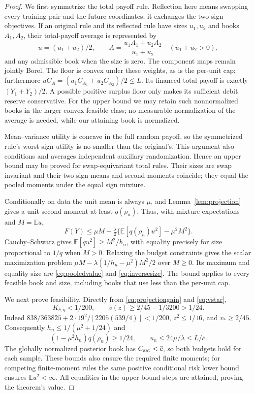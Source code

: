 \documentclass[11pt,a4paper]{amsart}
\theoremstyle{plain}
\theoremstyle{definition}
\theoremstyle{remark}
\newcommand{\EE}{\mathbb{E}}
\begin{document}
\begin{proof}
We first symmetrize the total payoff rule. Reflection here means swapping every training pair and the future coordinates; it exchanges the two sign objectives. If an original rule and its reflected rule have sizes $u_1,u_2$ and books $A_1,A_2$, their total-payoff average is represented by
\[
 u=(u_1+u_2)/2,\qquad
 A=\frac{u_1A_1+u_2A_2}{u_1+u_2}\quad(u_1+u_2>0),
\]
and any admissible book when the size is zero. The component maps remain jointly Borel. The floor is convex under these weights, as is the per-unit cap; furthermore
$uC_A=(u_1C_{A_1}+u_2C_{A_2})/2\le L$.
Its financed total payoff is exactly $(Y_1+Y_2)/2$. A possible positive surplus floor only makes its sufficient debit reserve conservative. For the upper bound we may retain such nonnormalized books in the larger convex feasible class; no measurable normalization of the average is needed, while our attaining book is normalized.

Mean--variance utility is concave in the full random payoff, so the symmetrized rule's worst-sign utility is no smaller than the original's. This argument also conditions and averages independent auxiliary randomization. Hence an upper bound may be proved for swap-equivariant total rules. Their sizes are swap invariant and their two sign means and second moments coincide; they equal the pooled moments under the equal sign mixture.

Conditionally on data the unit mean is always $\mu$, and Lemma~\ref{lem:projection} gives a unit second moment at least $q(\rho_n)$. Thus, with mixture expectations and $M=\EE u$,
\begin{equation}\label{eq:pooledupper}
 F(Y)\le\mu M-\tfrac\lambda2
      \{\EE[q(\rho_n)u^2]-\mu^2M^2\}.
\end{equation}
Cauchy--Schwarz gives $\EE[qu^2]\ge M^2/h_n$, with equality precisely for size proportional to $1/q$ when $M>0$. Relaxing the budget constraints gives the scalar maximization problem
$\mu M-\lambda(1/h_n-\mu^2)M^2/2$ over $M\ge0$. Its maximum and equality size are \eqref{eq:pooledvalue} and \eqref{eq:inversesize}. The bound applies to every feasible book and size, including books that use less than the per-unit cap.

We next prove feasibility. Directly from \eqref{eq:projectiongain} and \eqref{eq:vstar},
\begin{equation}\label{eq:variancefloor}
 K_{\delta,\eta}<1/200,\qquad
 v(z)\ge2/45-1/3200>1/24.
\end{equation}
Indeed
$838/363825+2\cdot19^2/[2205(539/4)]<1/200$, $z^2\le1/16$, and $v_*\ge2/45$. Consequently
$h_n\le1/(\mu^2+1/24)$ and
\[
 (1-\mu^2h_n)q(\rho_n)\ge1/24,\qquad
 u_n\le24\mu/\lambda\le L/\overline c.
\]
The globally normalized posterior book has $C_{\rm sat}<\overline c$, so both budgets hold for each sample. These bounds also ensure the required finite moments; for competing finite-moment rules the same positive conditional risk lower bound ensures $\EE u^2<\infty$. All equalities in the upper-bound steps are attained, proving the theorem's value.


\end{proof}
\end{document}
